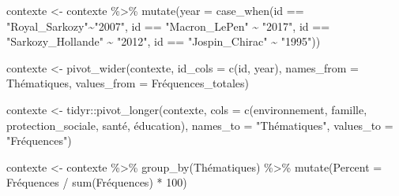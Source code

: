 \documentclass[
  letterpaper,
  DIV=11,
  numbers=noendperiod]{scrartcl}
\newenvironment{Shaded}{\begin{snugshade}}{\end{snugshade}}
\newcommand{\AttributeTok}[1]{\textcolor[rgb]{0.40,0.45,0.13}{#1}}
\newcommand{\DecValTok}[1]{\textcolor[rgb]{0.68,0.00,0.00}{#1}}
\newcommand{\FunctionTok}[1]{\textcolor[rgb]{0.28,0.35,0.67}{#1}}
\newcommand{\NormalTok}[1]{\textcolor[rgb]{0.00,0.23,0.31}{#1}}
\newcommand{\OtherTok}[1]{\textcolor[rgb]{0.00,0.23,0.31}{#1}}
\newcommand{\SpecialCharTok}[1]{\textcolor[rgb]{0.37,0.37,0.37}{#1}}
\newcommand{\StringTok}[1]{\textcolor[rgb]{0.13,0.47,0.30}{#1}}
\begin{document}
\begin{Shaded}
\begin{Highlighting}[]
\NormalTok{contexte }\OtherTok{\textless{}{-}}\NormalTok{ contexte }\SpecialCharTok{\%\textgreater{}\%} \FunctionTok{mutate}\NormalTok{(}\AttributeTok{year =} \FunctionTok{case\_when}\NormalTok{(id }\SpecialCharTok{==} \StringTok{"Royal\_Sarkozy"}\SpecialCharTok{\textasciitilde{}}\StringTok{"2007"}\NormalTok{, id }\SpecialCharTok{==} \StringTok{"Macron\_LePen"} \SpecialCharTok{\textasciitilde{}} \StringTok{"2017"}\NormalTok{, id }\SpecialCharTok{==} \StringTok{"Sarkozy\_Hollande"} \SpecialCharTok{\textasciitilde{}} \StringTok{"2012"}\NormalTok{, id }\SpecialCharTok{==} \StringTok{"Jospin\_Chirac"} \SpecialCharTok{\textasciitilde{}} \StringTok{"1995"}\NormalTok{))}

\NormalTok{contexte }\OtherTok{\textless{}{-}} \FunctionTok{pivot\_wider}\NormalTok{(contexte, }\AttributeTok{id\_cols =} \FunctionTok{c}\NormalTok{(id, year), }\AttributeTok{names\_from =}\NormalTok{ Thématiques, }\AttributeTok{values\_from =}\NormalTok{ Fréquences\_totales)}

\NormalTok{contexte }\OtherTok{\textless{}{-}}\NormalTok{ tidyr}\SpecialCharTok{::}\FunctionTok{pivot\_longer}\NormalTok{(contexte, }\AttributeTok{cols =} \FunctionTok{c}\NormalTok{(environnement, famille, protection\_sociale, santé, éducation), }\AttributeTok{names\_to =} \StringTok{"Thématiques"}\NormalTok{, }\AttributeTok{values\_to =} \StringTok{"Fréquences"}\NormalTok{)}
 
\NormalTok{contexte }\OtherTok{\textless{}{-}}\NormalTok{ contexte }\SpecialCharTok{\%\textgreater{}\%} \FunctionTok{group\_by}\NormalTok{(Thématiques) }\SpecialCharTok{\%\textgreater{}\%} \FunctionTok{mutate}\NormalTok{(}\AttributeTok{Percent =}\NormalTok{ Fréquences }\SpecialCharTok{/} \FunctionTok{sum}\NormalTok{(Fréquences) }\SpecialCharTok{*} \DecValTok{100}\NormalTok{)}
 

\end{Highlighting}
\end{Shaded}
\end{document}
